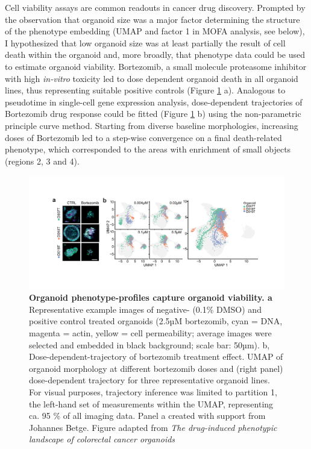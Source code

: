 \begin{flushleft}
Cell viability assays are common readouts in cancer drug discovery. Prompted by the observation that organoid size was a major factor determining the structure of the phenotype embedding (UMAP and factor 1 in MOFA analysis, see below), I hypothesized that low organoid size was at least partially the result of cell death within the organoid and, more broadly, that phenotype data could be used to estimate organoid viability. Bortezomib, a small molecule proteasome inhibitor with high \textit{in-vitro} toxicity led to dose dependent organoid death in all organoid lines, thus representing suitable positive controls (Figure \ref{fig_221} a). Analogous to pseudotime in single-cell  gene expression analysis, dose-dependent trajectories of Bortezomib drug response could be fitted (Figure \ref{fig_221} b) using the non-parametric principle curve method. Starting from diverse baseline morphologies, increasing doses of Bortezomib led to a step-wise convergence on a final death-related phenotype, which corresponded to the areas with enrichment of small objects (regions 2, 3 and 4). 

\begin{figure}[h]
\centering
\includegraphics[width=\textwidth,
                height=\textheight,
                keepaspectratio]{figures/promise/pdf/fig_2_1.pdf}
\caption[Organoid phenotype-profiles capture organoid viability]{\textbf{Organoid phenotype-profiles capture organoid viability. a} Representative example images of negative- (0.1\% DMSO) and positive control treated organoids (2.5µM bortezomib, cyan = DNA, magenta = actin, yellow = cell permeability; average images were selected and embedded in black background; scale bar: 50µm). b, Dose-dependent-trajectory of bortezomib treatment effect. UMAP of organoid morphology at different bortezomib doses and (right panel) dose-dependent trajectory for three representative organoid lines. For visual purposes, trajectory inference was limited to partition 1, the left-hand set of measurements within the UMAP, representing ca. 95 \% of all imaging data. Panel a created with support from Johannes Betge. Figure adapted from \textit{The drug-induced phenotypic landscape of colorectal cancer organoids} \parencite{betgeDruginducedPhenotypicLandscape2022}}
\label{fig_221}
\end{figure}
\bigbreak


\end{flushleft}
